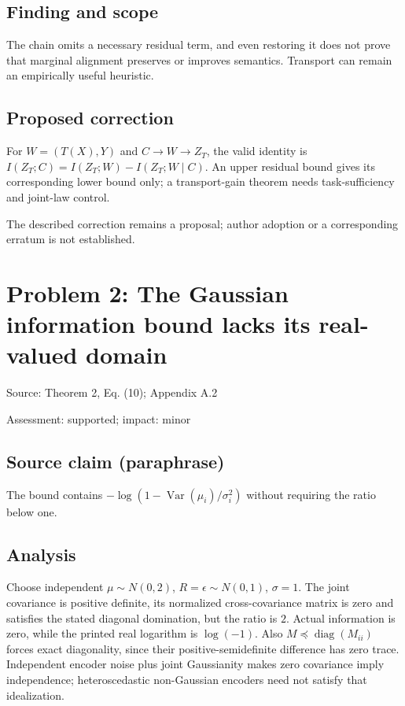 \documentclass[11pt]{article}
\begin{document}
\subsection*{Finding and scope}

The chain omits a necessary residual term, and even restoring it does not prove that marginal alignment preserves or improves semantics. Transport can remain an empirically useful heuristic.

\subsection*{Proposed correction}

For \(W=(T(X),Y)\) and \(C\to W\to Z_T\), the valid identity is \(I(Z_T;C)=I(Z_T;W)-I(Z_T;W\mid C)\). An upper residual bound gives its corresponding lower bound only; a transport-gain theorem needs task-sufficiency and joint-law control.

The described correction remains a proposal; author adoption or a corresponding erratum is not established.

\section*{Problem 2: The Gaussian information bound lacks its real-valued domain}

Source: Theorem 2, Eq. (10); Appendix A.2

Assessment: supported; impact: minor

\subsection*{Source claim (paraphrase)}

The bound contains \(-\log(1-\operatorname{Var}(\mu_i)/\sigma_i^2)\) without requiring the ratio below one.

\subsection*{Analysis}

Choose independent \(\mu\sim N(0,2)\), \(R=\epsilon\sim N(0,1)\), \(\sigma=1\). The joint covariance is positive definite, its normalized cross-covariance matrix is zero and satisfies the stated diagonal domination, but the ratio is \(2\). Actual information is zero, while the printed real logarithm is \(\log(-1)\). Also \(M\preceq\operatorname{diag}(M_{ii})\) forces exact diagonality, since their positive-semidefinite difference has zero trace. Independent encoder noise plus joint Gaussianity makes zero covariance imply independence; heteroscedastic non-Gaussian encoders need not satisfy that idealization.
\end{document}

